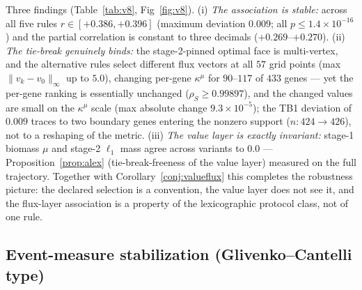 \documentclass[11pt,a4paper]{article}
\theoremstyle{plain}
\theoremstyle{definition}
\theoremstyle{remark}
\newcommand{\kmu}{\kappa^{\mu}}
\begin{document}
Three findings (Table~\ref{tab:v8}, Fig~\ref{fig:v8}). (i) \emph{The association is
stable:} across all five rules $r \in [+0.386, +0.396]$ (maximum
deviation $0.009$; all $p \le 1.4 \times 10^{-16}$) and the partial
correlation is constant to three decimals ($+0.269$--$+0.270$). (ii)
\emph{The tie-break genuinely binds:} the stage-2-pinned optimal face
is multi-vertex, and the alternative rules select different flux
vectors at all $57$ grid points (max $\|v_k - v_0\|_\infty$ up to
$5.0$), changing per-gene $\kmu$ for $90$--$117$ of $433$ genes ---
yet the per-gene ranking is essentially unchanged
($\rho_S \ge 0.99897$), and the changed values are small on the
$\kmu$ scale (max absolute change $9.3 \times 10^{-5}$); the TB1
deviation of $0.009$ traces to two boundary genes entering the
nonzero support ($n: 424 \to 426$), not to a reshaping of the metric.
(iii) \emph{The value layer is exactly invariant:} stage-1 biomass
$\mu$ and stage-2 $\ell_1$ mass agree across variants to $0.0$ ---
Proposition~\ref{prop:alex} (tie-break-freeness of the value layer)
measured on the full trajectory. Together with
Corollary~\ref{conj:valueflux} this completes the robustness picture: the
declared selection is a convention, the value layer does not see it,
and the flux-layer association is a property of the lexicographic
protocol class, not of one rule.

\subsection{Event-measure stabilization
(Glivenko--Cantelli type)}\label{sec:e32}
\end{document}
